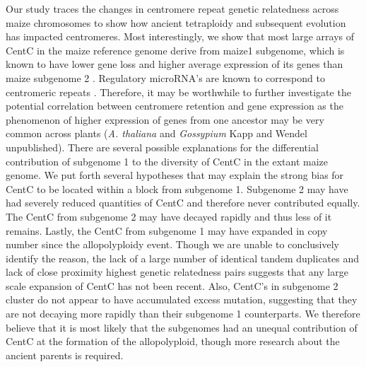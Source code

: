 
Our study traces the changes in centromere repeat genetic relatedness across maize chromosomes to show how ancient tetraploidy and subsequent evolution has impacted centromeres.  Most interestingly, we show that most large arrays of CentC in the maize reference genome derive from maize1 subgenome, which is known to have lower gene loss and higher average expression of its genes than maize subgenome 2 \cite{Schnable2011}.  Regulatory microRNA’s are known to correspond to centromeric repeats \citep{ReinhartBartel2002}.  Therefore, it may be worthwhile to further investigate the potential correlation between centromere retention and gene expression as the phenomenon of higher expression of genes from one ancestor may be very common across plants (\emph{A. thaliana} \cite{Cheng2012} and \emph{Gossypium} Kapp and Wendel unpublished).   There are several possible explanations for the differential contribution of subgenome 1 to the diversity of CentC in the extant maize  genome. We put forth several hypotheses that may explain the strong bias for CentC to be located within a block from subgenome 1. Subgenome 2 may have had severely reduced quantities of CentC and therefore never contributed equally.  The CentC from subgenome 2 may have decayed rapidly and thus less of it remains.  Lastly, the CentC from subgenome 1 may have expanded in copy number since the allopolyploidy event.  Though we are unable to conclusively identify the reason, the lack of a large number of identical tandem duplicates  and lack of close proximity highest genetic relatedness pairs suggests that any large scale expansion of CentC has not been recent.  Also, CentC’s in subgenome 2 cluster do not appear to have accumulated excess mutation, suggesting that they are not decaying more rapidly than their subgenome 1 counterparts.  We therefore believe that it is most likely that the subgenomes had an unequal contribution of CentC at the formation of the allopolyploid, though more research about the ancient parents is required.  

